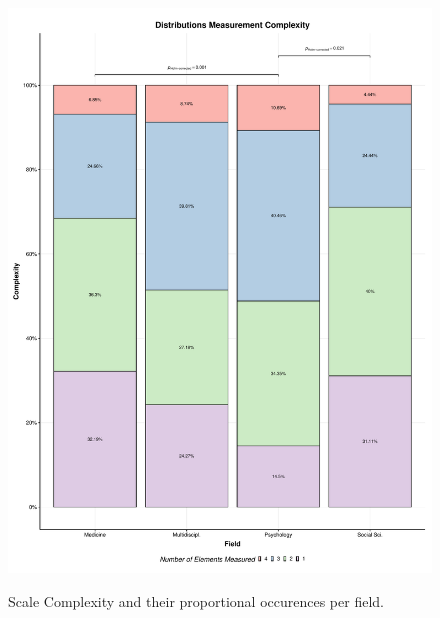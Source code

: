 \begin{figure}[h]
\centering
\caption{Scale Complexity and their proportional occurences per field.}
\includegraphics[width=\textwidth]{Figures/FieldPlotComplexityAverage-1}
\label{fig:FieldPlotComplexityAverage}
\end{figure}

